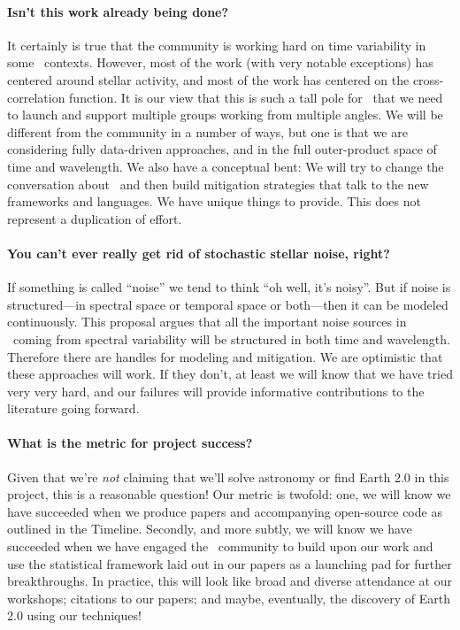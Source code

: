 \documentclass[12pt, letterpaper]{article}
\begin{document}
\paragraph{Isn't this work already being done?}
It certainly is true that the community is working hard on time
variability in some \EPRV\ contexts.
However, most of the work (with very notable exceptions) has centered
around stellar activity, and most of the work has centered on the
cross-correlation function.
It is our view that this is such a tall pole for \EPRV\ that we need
to launch and support multiple groups working from multiple angles.
We will be different from the community in a number of ways, but one
is that we are considering fully data-driven approaches, and in the
full outer-product space of time and wavelength.
We also have a conceptual bent: We will try to change the conversation
about \EPRV\ and then build mitigation strategies that talk to the
new frameworks and languages.
We have unique things to provide.
This does not represent a duplication of effort.

\paragraph{You can't ever really get rid of stochastic stellar noise, right?}
If something is called ``noise'' we tend to think ``oh well, it's
noisy''. But if noise is structured---in spectral space or temporal
space or both---then it can be modeled continuously.
This proposal argues that all the important noise sources in \EPRV\ coming
from spectral variability will be structured in both time and wavelength.
Therefore there are handles for modeling and mitigation.
We are optimistic that these approaches will work.
If they don't, at least we will know that we have tried very very hard, 
and our failures will provide informative contributions to the 
literature going forward.

\paragraph{What is the metric for project success?}
Given that we're \textit{not} claiming that we'll 
solve astronomy or find Earth 2.0 in this project, this is a reasonable 
question! Our metric is twofold: one, we will know we have succeeded when we 
produce papers and accompanying open-source code as outlined in the Timeline. 
Secondly, and more subtly, we will know we have succeeded when we have engaged 
the \EPRV\ community to build upon our work and use the statistical framework 
laid out in our papers as a launching pad for further breakthroughs. 
In practice, this will look like broad and diverse attendance at our workshops; 
citations to our papers; and maybe, eventually, the discovery of Earth 2.0
using our techniques!

\clearpage

\raggedright
\end{document}
